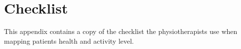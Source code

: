 \chapter{Checklist}
\label{checklist}
This appendix contains a copy of the checklist the physiotherapists use when mapping patients health and activity level.

